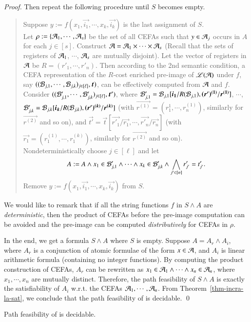 {\begin{proof}
Then repeat the following procedure until $S$ becomes empty.
%
\begin{quote}
Suppose $y := f(x_1, \vec{i_1}, \cdots, x_k, \vec{i_k})$ is the last assignment of $S$. 
\\
Let $\rho := \{\mathcal{A}_1, \cdots, \mathcal{A}_s\}$ be the set of all CEFAs such that $y \in \mathcal{A}_j$ occurs in $A$ for each $j \in [s]$. Construct $\mathcal{A} = \mathcal{A}_1 \times \cdots \times \mathcal{A}_s$ (Recall that the sets of registers of $\mathcal{A}_1$, $\cdots$, $\mathcal{A}_s$ are mutually disjoint). Let  the vector of registers in $\mathcal{A}$ be $R = (r'_1, \cdots, r'_n)$. Then according to the 2nd semantic condition, 
a CEFA representation of the $R$-cost enriched pre-image of $\mathscr{L}(\mathcal{A})$ under $f$, say $((\cB_{j, 1}, \cdots, \cB_{j, k})_{j \in [\ell]}, \vec{t})$, can be effectively computed from $\mathcal{A}$ and $f$. Consider $((\cB'_{j, 1}, \cdots, \cB'_{j, k})_{j \in [\ell]}, \vec{t'})$, where $\cB'_{j, 1} = \cB_{j, 1}[\vec{i_1}/R(\cB_{j,1}), \vec{(r')^{(1)}}/\vec{r^{(1)}}]$, $\cdots$, $\cB'_{j,k}=\cB_{j,k}[\vec{i_k}/R(\cB_{j,k}), \vec{(r')^{(k)}}/\vec{r^{(k)}}]$ (with $\vec{r^{(1)}}= (r^{1}_1, \cdots, r^{(1)}_n)$, similarly for $\vec{r^{(2)}}$ and so on), and $\vec{t'} = \vec{t}[\vec{r'_1}/\vec{r_1}, \cdots, \vec{r'_n}/\vec{r_n}]$ (with $\vec{r_1} = (r^{(1)}_1, \cdots, r^{(k)}_1)$, similarly for $\vec{r^{(2)}}$ and so on). 
\\
Nondeterministically choose $j \in [\ell]$ and let 
$$A:= A \wedge x_1 \in \mathcal{B}'_{j, 1} \wedge \cdots \wedge x_k \in \mathcal{B}'_{j, k}  \wedge \bigwedge \limits_{j' \in [n]} r'_{j'} = t'_{j'}.$$
%
Remove $y := f(x_1, \vec{i_1}, \cdots, x_k, \vec{i_k})$ from $S$.
\end{quote}

We would like to remark that if all the string functions $f$ in $S \wedge A$ are \emph{deterministic}, then the product of CEFAs before the pre-image computation can be avoided and the pre-image can be computed \emph{distributively} for CEFAs in $\rho$.

In the end, we get a formula $S \wedge A$ where $S$ is empty. Suppose $A = A_r \wedge A_i$, where $A_r$ is a conjunction of atomic formulae of the form $x \in \mathcal{A}$, and $A_i$ is linear arithmetic formula (containing no integer functions). By computing the product construction of CEFAs, $A_r$ can be rewritten as $x_1 \in \mathcal{A}_1 \wedge \cdots \wedge x_n \in \mathcal{A}_n$, where $x_1,\cdots, x_n$ are mutually distinct. Therefore, the path feasibility of $S \wedge A$ is exactly the satisfiability of $A_i$ w.r.t. the CEFAs $\mathcal{A}_1, \cdots, \mathcal{A}_n$. From Theorem~\ref{thm-incra-la-sat}, we conclude that the path feasibility of  {\slint} is decidable.
\qed
\end{proof}

\begin{corollary}
Path feasibility of {\cslint} is decidable.
\end{corollary}
}
